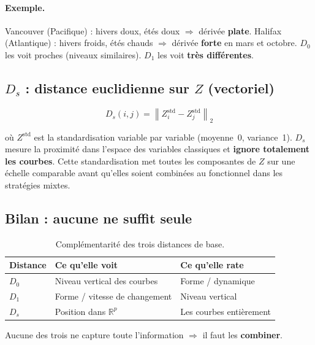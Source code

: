 \documentclass[11pt, a4paper]{article}
\newcommand{\R}{\mathbb{R}}
\begin{document}
\paragraph{Exemple.}
Vancouver (Pacifique) : hivers doux, étés doux $\Rightarrow$ dérivée
\textbf{plate}. Halifax (Atlantique) : hivers froids, étés chauds
$\Rightarrow$ dérivée \textbf{forte} en mars et octobre. $D_0$ les voit
proches (niveaux similaires). $D_1$ les voit \textbf{très différentes}.

\subsection{$D_s$ : distance euclidienne sur $Z$ (\textbf{vectoriel})}

\[
  D_s(i,j) = \left\| Z_i^{\text{std}} - Z_j^{\text{std}} \right\|_2
\]

où $Z^{\text{std}}$ est la standardisation variable par variable
(moyenne~0, variance~1). $D_s$ mesure la proximité dans l'espace des
variables classiques et \textbf{ignore totalement les courbes}. Cette
standardisation met toutes les composantes de $Z$ sur une échelle
comparable avant qu'elles soient combinées au fonctionnel dans les
stratégies mixtes.

\subsection{Bilan : aucune ne suffit seule}

\begin{table}[H]
\centering
\begin{tabular}{lll}
  \toprule
  \textbf{Distance} & \textbf{Ce qu'elle voit} & \textbf{Ce qu'elle rate} \\
  \midrule
  $D_0$ & Niveau vertical des courbes & Forme / dynamique \\
  $D_1$ & Forme / vitesse de changement & Niveau vertical \\
  $D_s$ & Position dans $\R^p$ & Les courbes entièrement \\
  \bottomrule
\end{tabular}
\caption{Complémentarité des trois distances de base.}
\end{table}

Aucune des trois ne capture toute l'information $\Rightarrow$ il faut les
\textbf{combiner}.
\end{document}
